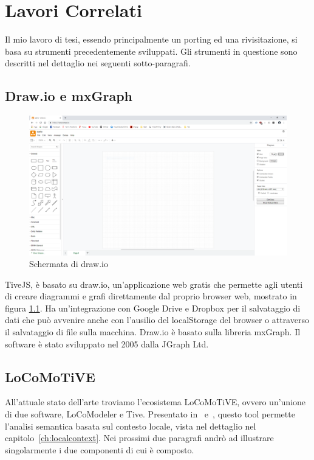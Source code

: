 \chapter{Lavori Correlati}
    Il mio lavoro di tesi, essendo principalmente un porting ed una rivisitazione, si basa su strumenti precedentemente sviluppati.
    Gli strumenti in questione sono descritti nel dettaglio nei seguenti sotto-paragrafi.

    \section{Draw.io e mxGraph}

        \begin{figure}[htbp]
            \centering
            \includegraphics[scale=0.17]{Figure/drawio.png}
            \caption{Schermata di draw.io}
            \label{fig:drawio}
        \end{figure}

        TiveJS, è basato su draw.io, un'applicazione web gratis che permette agli utenti di creare diagrammi e grafi direttamente dal proprio browser web, mostrato in figura \ref{fig:drawio}. Ha un'integrazione con Google Drive e Dropbox per il salvataggio di dati che può avvenire anche con l'ausilio del localStorage del browser o attraverso il salvataggio di file sulla macchina. Draw.io è basato sulla libreria mxGraph. Il software è stato sviluppato nel 2005 dalla JGraph Ltd.

    \section{LoCoMoTiVE}
        
        All'attuale stato dell'arte troviamo l'ecosistema LoCoMoTiVE, ovvero un'unione di due software, LoCoModeler e Tive. Presentato in~\cite{extending_localcontext} e~\cite{localcontext}, questo tool permette l'analisi semantica basata sul contesto locale, vista nel dettaglio nel capitolo~\ref{ch:localcontext}. Nei prossimi due paragrafi andrò ad illustrare singolarmente i due componenti di cui è composto.

